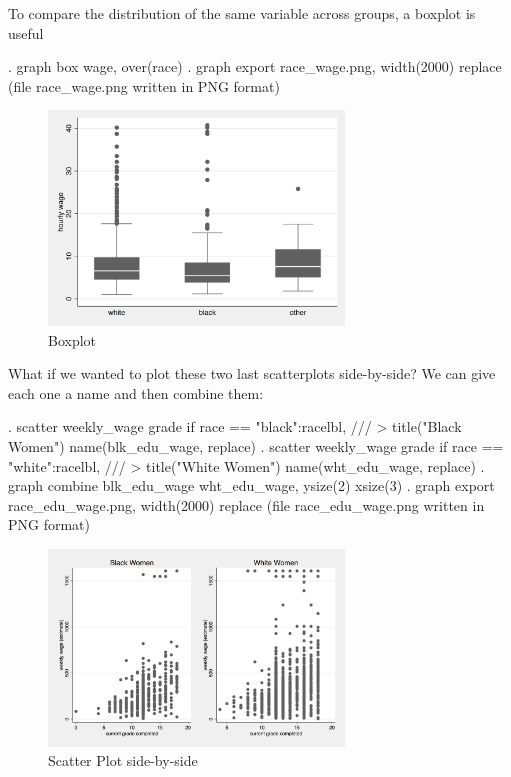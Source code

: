 \documentclass[]{article}
\begin{document}
To compare the distribution of the same variable across groups, a
boxplot is useful

\begin{stlog}
. graph box wage, over(race)
{\smallskip}
. graph export race_wage.png, width(2000) replace
(file race_wage.png written in PNG format)
{\smallskip}
\end{stlog}

\begin{figure}
\centering
\includegraphics[width=0.70000\textwidth]{race_wage.png}
\caption{Boxplot}
\end{figure}

What if we wanted to plot these two last scatterplots side-by-side? We
can give each one a name and then combine them:

\begin{stlog}
. scatter weekly_wage grade if race == "black":racelbl, /// 
>    title("Black Women") name(blk_edu_wage, replace) 
{\smallskip}
. scatter weekly_wage grade if race == "white":racelbl, ///
>    title("White Women") name(wht_edu_wage, replace)
{\smallskip}
. graph combine blk_edu_wage wht_edu_wage, ysize(2) xsize(3)
{\smallskip}
. graph export race_edu_wage.png, width(2000) replace
(file race_edu_wage.png written in PNG format)
{\smallskip}
\end{stlog}

\begin{figure}
\centering
\includegraphics[width=0.70000\textwidth]{race_edu_wage.png}
\caption{Scatter Plot side-by-side}
\end{figure}
\end{document}
